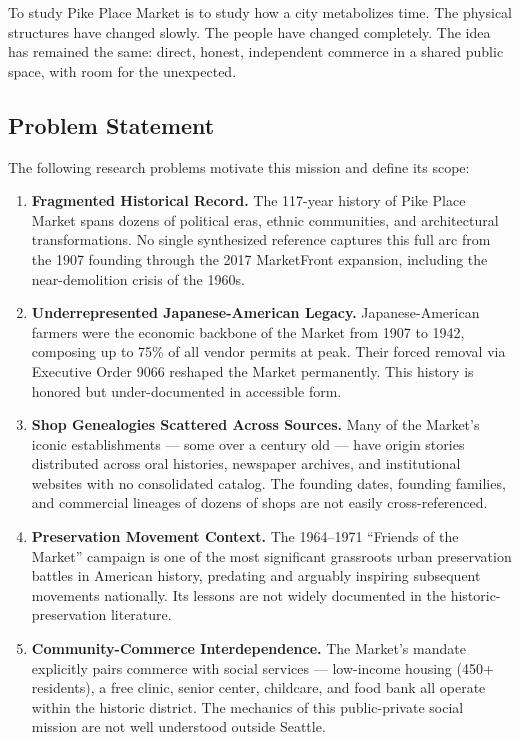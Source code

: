 \documentclass[11pt,letterpaper]{article}
\begin{document}
To study Pike Place Market is to study how a city metabolizes time. The physical structures have changed slowly. The people have changed completely. The idea has remained the same: direct, honest, independent commerce in a shared public space, with room for the unexpected.

\subsection{Problem Statement}

The following research problems motivate this mission and define its scope:

\begin{enumerate}[leftmargin=*, label=\textbf{P\arabic*.}]
  \item \textbf{Fragmented Historical Record.} The 117-year history of Pike Place Market spans dozens of political eras, ethnic communities, and architectural transformations. No single synthesized reference captures this full arc from the 1907 founding through the 2017 MarketFront expansion, including the near-demolition crisis of the 1960s.

  \item \textbf{Underrepresented Japanese-American Legacy.} Japanese-American farmers were the economic backbone of the Market from 1907 to 1942, composing up to 75\% of all vendor permits at peak. Their forced removal via Executive Order 9066 reshaped the Market permanently. This history is honored but under-documented in accessible form.

  \item \textbf{Shop Genealogies Scattered Across Sources.} Many of the Market's iconic establishments --- some over a century old --- have origin stories distributed across oral histories, newspaper archives, and institutional websites with no consolidated catalog. The founding dates, founding families, and commercial lineages of dozens of shops are not easily cross-referenced.

  \item \textbf{Preservation Movement Context.} The 1964--1971 ``Friends of the Market'' campaign is one of the most significant grassroots urban preservation battles in American history, predating and arguably inspiring subsequent movements nationally. Its lessons are not widely documented in the historic-preservation literature.

  \item \textbf{Community-Commerce Interdependence.} The Market's mandate explicitly pairs commerce with social services --- low-income housing (450+ residents), a free clinic, senior center, childcare, and food bank all operate within the historic district. The mechanics of this public-private social mission are not well understood outside Seattle.
\end{enumerate}
\end{document}
